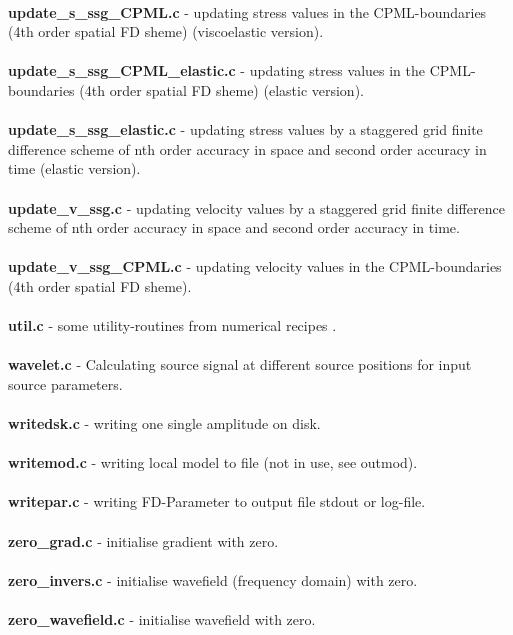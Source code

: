 \\
\textbf{update\_s\_ssg\_CPML.c} - updating stress values in the CPML-boundaries (4th order spatial FD sheme) (viscoelastic version).\\
\\
\textbf{update\_s\_ssg\_CPML\_elastic.c} - updating stress values in the CPML-boundaries (4th order spatial FD sheme) (elastic version).\\
\\
\textbf{update\_s\_ssg\_elastic.c} - updating stress values by a staggered grid finite difference scheme of nth order accuracy in space and second order accuracy in time (elastic version).\\
\\
\textbf{update\_v\_ssg.c} - updating velocity values by a staggered grid finite difference scheme of nth order accuracy in space and second order accuracy in time.\\
\\
\textbf{update\_v\_ssg\_CPML.c} - updating velocity values in the CPML-boundaries (4th order spatial FD sheme).\\
\\
\textbf{util.c} - some utility-routines from numerical recipes \citep{pre90}.\\
\\
\textbf{wavelet.c} - Calculating source signal at different source positions for input source parameters.\\
\\
\textbf{writedsk.c} - writing one single amplitude on disk.\\
\\
\textbf{writemod.c} - writing local model to file (not in use, see outmod).\\
\\
\textbf{writepar.c} - writing FD-Parameter to output file stdout or log-file.\\
\\
\textbf{zero\_grad.c} - initialise gradient with zero.\\
\\
\textbf{zero\_invers.c} - initialise wavefield (frequency domain) with zero.\\
\\
\textbf{zero\_wavefield.c} - initialise wavefield with zero.\\